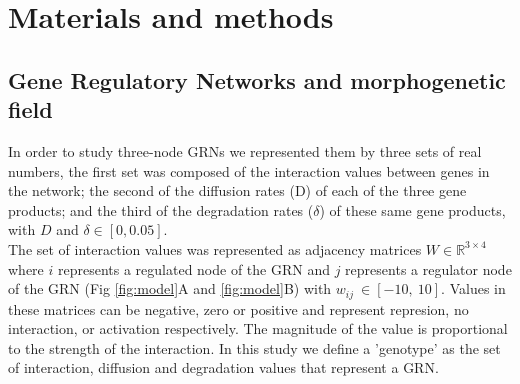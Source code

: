 \documentclass[10pt,letterpaper]{article}
\begin{document}


\section*{Materials and methods}
\subsection*{Gene Regulatory Networks and morphogenetic field}

In order to study three-node GRNs we represented them by three sets of real
numbers, the first set was composed of the interaction values
between genes in the network; the second of the diffusion rates (D) of each of
the three gene products; and the third of the degradation rates ($\delta$) of
these same gene products, with $D$ and $\delta  \in [0, 0.05]$.\\

The set of interaction values was represented as adjacency matrices $W \in
\mathbb{R}^{3\times4}$ where $i$ represents a regulated node of the GRN and $j$
represents a regulator node of the GRN (Fig \ref{fig:model}A and
\ref{fig:model}B) with $w_{\textit{ij}}~\in [-10,\ 10]$. Values in these
matrices can be negative, zero or positive and represent represion, no
interaction, or activation respectively. The magnitude of the value is
proportional to the strength of the interaction. In this study we define
a 'genotype' as the set of interaction, diffusion and degradation values that
represent a GRN.\\
\end{document}

